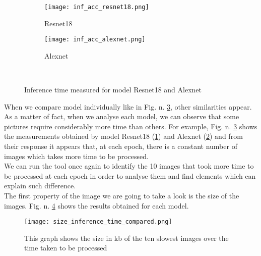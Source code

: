 \begin{figure}[h]
     \begin{subfigure}{0.5\textwidth}
	    \texttt{[image: inf\_acc\_resnet18.png]}
	    \caption{Resnet18}
         \label{fig:inf_acc_resnet18}
         
     \end{subfigure}
     \hfill
     \begin{subfigure}{0.5\textwidth}
	    \texttt{[image: inf\_acc\_alexnet.png]}
	    \caption{Alexnet}
        \label{fig:inf_acc_alexnet}
        
     \end{subfigure}\\
     \caption{Inference time measured for model Resnet18 and Alexnet}
        \label{fig:inf_acc_c}
\end{figure}
When we compare model individually like in Fig. n. \ref{fig:inf_acc_c}, other similarities appear. As a matter of fact, when we analyse each model, we can observe that some pictures require considerably more time than others. For example, Fig. n. \ref{fig:inf_acc_c} shows the measurements obtained by model Resnet18 (\ref{fig:inf_acc_resnet18}) and Alexnet (\ref{fig:inf_acc_alexnet}) and from their response it appears that, at each epoch, there is a constant number of images which takes more time to be processed. \\
We can run the tool once again to identify the 10 images that took more time to be processed at each epoch in order to analyse them and find elements which can explain such difference. \\
The first property of the image we are going to take a look is the size of the images. Fig. n. \ref{fig:size_inference_time_compared} shows the results obtained for each model. 


\begin{figure}[h]
       \centering 
	    \texttt{[image: size\_inference\_time\_compared.png]}
        \caption[Size of the images over inference time]{This graph shows the size in kb of the ten slowest images over the time taken to be processed }
         \label{fig:size_inference_time_compared}
\end{figure}



